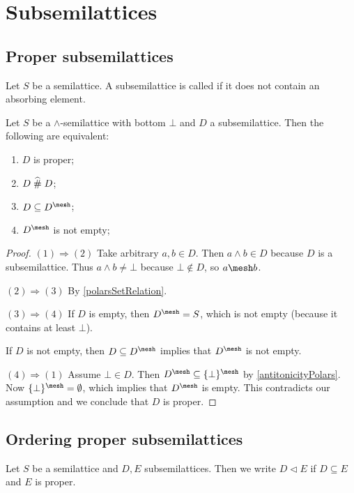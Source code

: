 \section{Subsemilattices}
\subsection{Proper subsemilattices}
\begin{definition}
Let $S$ be a semilattice. A subsemilattice is called  if it does not contain an absorbing element.
\end{definition}

\begin{lemma} \label{properSubsemilatticeLemma}
Let $S$ be a $\wedge$-semilattice with bottom $\bot$ and $D$ a subsemilattice. Then the following are equivalent:
\begin{enumerate}
\item $D$ is proper;
\item $D\mathrel{\widehat{\#}} D$;
\item $D\subseteq D^\mesh$;
\item $D^\mesh$ is not empty;
\end{enumerate}
\end{lemma}
\begin{proof}
$(1) \Rightarrow (2)$ Take arbitrary $a,b\in D$. Then $a\wedge b\in D$ because $D$ is a subsemilattice. Thus $a\wedge b \neq \bot$ because $\bot\notin D$, so $a\mesh b$.

$(2) \Rightarrow (3)$ By \ref{polarsSetRelation}.

$(3) \Rightarrow (4)$ If $D$ is empty, then $D^\mesh = S$, which is not empty (because it contains at least $\bot$). 

If $D$ is not empty, then $D\subseteq D^\mesh$ implies that $D^\mesh$ is not empty.

$(4) \Rightarrow (1)$ Assume $\bot\in D$. Then $D^\mesh \subseteq \{\bot\}^\mesh$ by \ref{antitonicityPolars}. Now $\{\bot\}^\mesh = \emptyset$, which implies that $D^\mesh$ is empty. This contradicts our assumption and we conclude that $D$ is proper.
\end{proof}

\subsection{Ordering proper subsemilattices}
\begin{definition}
Let $S$ be a semilattice and $D,E$ subsemilattices. Then we write $D\lhd E$ if $D\subseteq E$ and $E$ is proper.
\end{definition}

